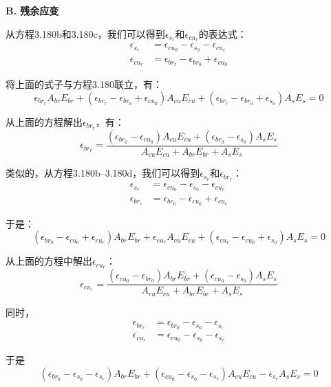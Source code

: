 \textbf{B. 残余应变}

从方程3.180b和3.180c，我们可以得到$\epsilon_{s_r}$和$\epsilon_{cu_r}$的表达式：
\begin{eqnarray*}%
\epsilon_{s_r}&=\epsilon_{cu_0}-\epsilon_{s_0}-\epsilon_{cu_r}\\
\epsilon_{cu_r}&=\epsilon_{br_r}-\epsilon_{br_0}+\epsilon_{cu_0}
\end{eqnarray*}

将上面的式子与方程3.180联立，有：
\begin{equation*}
\epsilon_{br_r}A_{br}E_{br}+(\epsilon_{br_r}-\epsilon_{br_0}+\epsilon_{cu_0})A_{cu}E_{cu}+(\epsilon_{br_r}-\epsilon_{br_0}+\epsilon_{s_0})A_sE_s=0
\end{equation*}

从上面的方程解出$\epsilon_{br_r}$，有：
 \begin{equation}%
\epsilon_{br_r}=\frac{(\epsilon_{br_0}-\epsilon_{cu_0})A_{cu}E_{cu}+(\epsilon_{br_0}-\epsilon_{s_0})A_sE_s}{A_{cu}E_{cu}+A_{br}E_{br}+A_{s}E_{s}}
\end{equation}

类似的，从方程3.180b–3.180d，我们可以得到$\epsilon_{s_r}$和$\epsilon_{br_r}$：
\begin{eqnarray*}
\epsilon_{s_r}&=\epsilon_{cu_0}-\epsilon_{s_0}-\epsilon_{cu_r}\\
\epsilon_{br_r}&=\epsilon_{br_0}-\epsilon_{cu_0}+\epsilon_{cu_r}
\end{eqnarray*}

于是：
\begin{equation*}
(\epsilon_{br_0}-\epsilon_{cu_0}+\epsilon_{cu_r})A_{br}E_{br}+\epsilon_{cu_r}A_{cu}E_{cu}+(\epsilon_{cu_r}-\epsilon_{cu_0}+\epsilon_{s_0})A_sE_s=0
\end{equation*}

从上面的方程中解出$\epsilon_{cu_r}$：
\begin{equation*}%
\epsilon_{cu_r}=\frac{(\epsilon_{cu_0}-\epsilon_{br_0})A_{br}E_{br}+(\epsilon_{cu_0}-\epsilon_{s_0})A_sE_s}{A_{cu}E_{cu}+A_{br}E_{br}+A_{s}E_{s}}\tag{3.181b}
\end{equation*}

同时，
\begin{eqnarray*}
\epsilon_{br_r}&=\epsilon_{br_0}-\epsilon_{s_0}-\epsilon_{s_r}\\
\epsilon_{cu_r}&=\epsilon_{cu_0}-\epsilon_{s_0}-\epsilon_{s_r}
\end{eqnarray*}

于是
\begin{equation*}
(\epsilon_{br_0}-\epsilon_{s_0}-\epsilon_{s_r})A_{br}E_{br}+(\epsilon_{cu_0}-\epsilon_{s_0}-\epsilon_{s_r})A_{cu}E_{cu}-\epsilon_{s_r}A_sE_s=0
\end{equation*}

